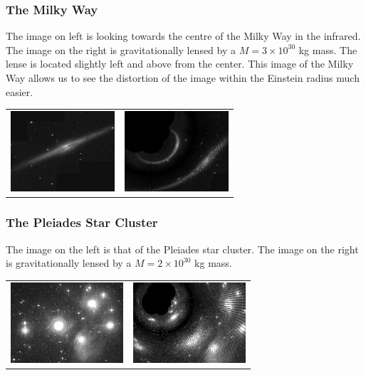 \documentclass[a4paper]{IEEEtran}
\begin{document}
\subsubsection{The Milky Way}
The image on left is looking towards the centre of the Milky Way in the
infrared. The image on the right is gravitationally lensed by a 
$M = 3 \times 10^{30}$ kg mass. The lense is located slightly left and above
from the center. This image of the Milky Way allows us to see the distortion
of the image within the Einstein radius much easier.
\begin{center}
    \begin{tabular}{cc}
        \includegraphics[height=3cm]{Pics/milky.eps} &
        \includegraphics[height=3cm]{Pics/milky3e30.eps} \\
    \end{tabular}
\end{center}

\subsubsection{The Pleiades Star Cluster}
The image on the left is that of the Pleiades star cluster. The image
on the right is gravitationally lensed by a $M = 2 \times 10^{30}$ kg
mass.
\begin{center}
    \begin{tabular}{cc}
        \includegraphics[height=3cm]{Pics/pl.eps} &
        \includegraphics[height=3cm]{Pics/pl2e30.eps} \\
    \end{tabular}
\end{center}
\end{document}
